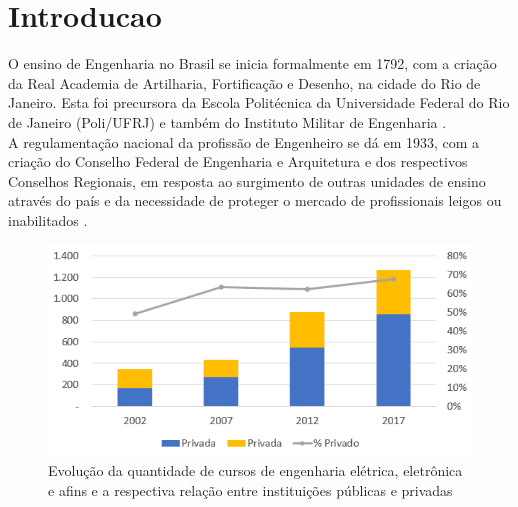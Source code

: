 \chapter{Introducao} \label{ch:intro}

	O ensino de Engenharia no Brasil se inicia formalmente em 1792, com a criação da Real Academia de Artilharia, Fortificação e Desenho, na cidade do Rio de Janeiro. Esta foi precursora da Escola Politécnica da Universidade Federal do Rio de Janeiro (Poli/UFRJ) e também do Instituto Militar de Engenharia \cite{surgimento_engenharia_brasil}.\\
	
	
	A regulamentação nacional da profissão de Engenheiro se dá em 1933, com a criação do Conselho Federal de Engenharia e Arquitetura e dos respectivos Conselhos Regionais, em resposta ao surgimento de outras unidades de ensino através do país e da necessidade de proteger o mercado de profissionais leigos ou inabilitados \cite{historia-confea}.\\
	
	\begin{figure}[h!]
		\centering
		\includegraphics[width=0.8\linewidth]{Figuras/evolucao_cursos_engenharias}
		\caption[Evolução da quantidade de cursos de engenharia elétrica, eletrônica e afins]{Evolução da quantidade de cursos de engenharia elétrica, eletrônica e afins e a respectiva relação entre instituições públicas e privadas \cite{censo_educacao_superior}}
		\label{fig:evolucaocursosengenharias}
	\end{figure}
	
